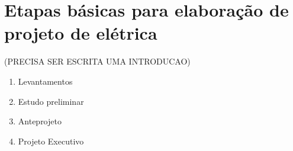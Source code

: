 \section{Etapas básicas para elaboração de projeto de elétrica} \label{section: referencias}

(PRECISA SER ESCRITA UMA INTRODUCAO)
\begin{enumerate}
	\item Levantamentos
	\item Estudo preliminar 
	\item Anteprojeto
	\item Projeto Executivo 
\end{enumerate}









\newpage
